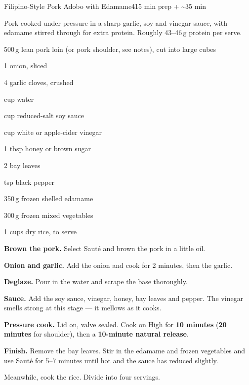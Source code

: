 \begin{recipebox}{Filipino-Style Pork Adobo with Edamame}{4}{15 min prep + \textasciitilde35 min}

Pork cooked under pressure in a sharp garlic, soy and vinegar sauce, with
edamame stirred through for extra protein. Roughly 43--46\,g protein per serve.

\begin{ingredients}
  \item 500\,g lean pork loin (or pork shoulder, see notes), cut into large cubes
  \item 1 onion, sliced
  \item 4 garlic cloves, crushed
  \item {} cup water
  \item {} cup reduced-salt soy sauce
  \item {} cup white or apple-cider vinegar
  \item 1 tbsp honey or brown sugar
  \item 2 bay leaves
  \item {} tsp black pepper
  \item 350\,g frozen shelled edamame
  \item 300\,g frozen mixed vegetables
  \item 1 cups dry rice, to serve
\end{ingredients}

\begin{method}
  \item \textbf{Brown the pork.} Select Saut\'e and brown the pork in a little oil.
  \item \textbf{Onion and garlic.} Add the onion and cook for 2 minutes, then the garlic.
  \item \textbf{Deglaze.} Pour in the water and scrape the base thoroughly.
  \item \textbf{Sauce.} Add the soy sauce, vinegar, honey, bay leaves and pepper. The vinegar smells strong at this stage --- it mellows as it cooks.
  \item \textbf{Pressure cook.} Lid on, valve sealed. Cook on High for \textbf{10 minutes} (\textbf{20 minutes} for shoulder), then a \textbf{10-minute natural release}.
  \item \textbf{Finish.} Remove the bay leaves. Stir in the edamame and frozen vegetables and use Saut\'e for 5--7 minutes until hot and the sauce has reduced slightly.
  \item Meanwhile, cook the rice. Divide into four servings.
\end{method}


\end{recipebox}
